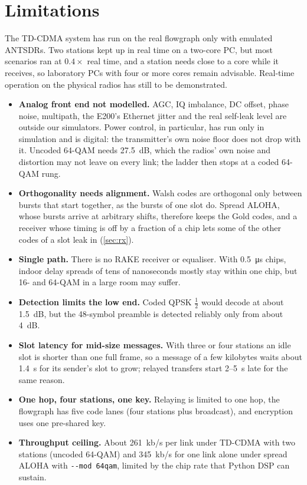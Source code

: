 \documentclass[11pt,a4paper,oneside]{report}
\newcommand{\code}[1]{\texttt{\small #1}}
\begin{document}
\section{Limitations}
\begin{warnbox}
The TD-CDMA system has run on the real flowgraph only with emulated ANTSDRs. Two stations kept up in
real time on a two-core PC, but most scenarios ran at $0.4\times$ real time, and a station needs close to
a core while it receives, so laboratory PCs with four or more cores remain advisable. Real-time
operation on the physical radios has still to be demonstrated.
\end{warnbox}

\begin{itemize}
  \item \textbf{Analog front end not modelled.} AGC, IQ imbalance, DC offset, phase noise, multipath, the
        E200's Ethernet jitter and the real self-leak level are outside our simulators. Power control,
        in particular, has run only in simulation and is digital: the transmitter's own noise floor does
        not drop with it. Uncoded 64-QAM needs \SI{27.5}{dB}, which the radios' own noise and
        distortion may not leave on every link; the ladder then stops at a coded 64-QAM rung.
  \item \textbf{Orthogonality needs alignment.} Walsh codes are orthogonal only between bursts that start
        together, as the bursts of one slot do. Spread ALOHA, whose bursts arrive at arbitrary shifts,
        therefore keeps the Gold codes, and a receiver whose timing is off by a fraction of a chip lets
        some of the other codes of a slot leak in (\cref{sec:rx}).
  \item \textbf{Single path.} There is no RAKE receiver or equaliser. With \SI{0.5}{\micro s} chips,
        indoor delay spreads of tens of nanoseconds mostly stay within one chip, but 16- and 64-QAM in a
        large room may suffer.
  \item \textbf{Detection limits the low end.} Coded QPSK $\tfrac12$ would decode at about \SI{1.5}{dB}, but
        the 48-symbol preamble is detected reliably only from about \SI{4}{dB}.
  \item \textbf{Slot latency for mid-size messages.} With three or four stations an idle slot is shorter
        than one full frame, so a message of a few kilobytes waits about \SI{1.4}{s} for its sender's slot to
        grow; relayed transfers start 2--\SI{5}{s} late for the same reason.
  \item \textbf{One hop, four stations, one key.} Relaying is limited to one hop, the flowgraph has five
        code lanes (four stations plus broadcast), and encryption uses one pre-shared key.
  \item \textbf{Throughput ceiling.} About \SI{261}{kb/s} per link under TD-CDMA with two stations
        (uncoded 64-QAM) and \SI{345}{kb/s} for one link alone under spread ALOHA with \code{-{}-mod 64qam},
        limited by the chip rate that Python DSP can sustain.
\end{itemize}
\end{document}
